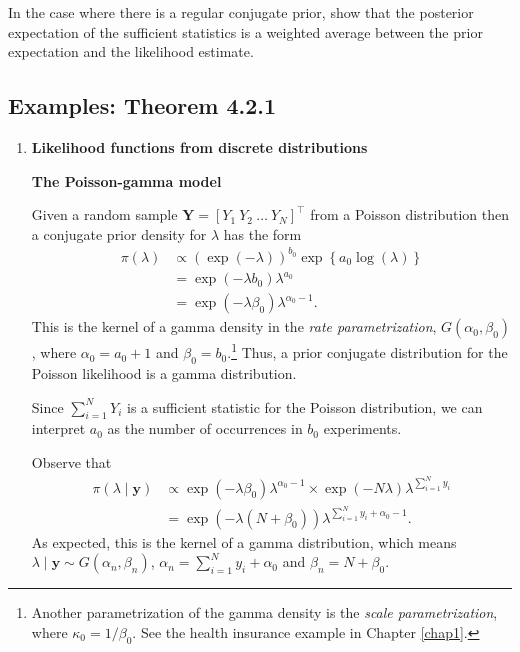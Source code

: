In the case where there is a regular conjugate prior, \cite{diaconis1979conjugate} show that the posterior expectation of the sufficient statistics is a weighted average between the prior expectation and the likelihood estimate.

\subsection{Examples: Theorem 4.2.1}\label{sec421}

\begin{enumerate}
	\item \textbf{Likelihood functions from discrete distributions}

\textbf{The Poisson-gamma model}

Given a random sample $\bm{Y}=[Y_1 \ Y_2 \ \dots \ Y_N]^{\top}$ from a Poisson distribution then a conjugate prior density for $\lambda$ has the form 
\begin{align}
	\pi(\lambda)&\propto \left(\exp(-\lambda)\right)^{b_0} \exp\left\{a_0\log(\lambda)\right\}\nonumber\\
	& = \exp(-\lambda b_0) \lambda^{a_0}\nonumber\\
	& = \exp(-\lambda \beta_0) \lambda^{\alpha_0-1}.\nonumber
\end{align}
This is the kernel of a gamma density in the \textit{rate parametrization}, \( G(\alpha_0, \beta_0) \), where \( \alpha_0 = a_0 + 1 \) and \( \beta_0 = b_0 \).\footnote{Another parametrization of the gamma density is the \textit{scale parametrization}, where \( \kappa_0 = 1/\beta_0 \). See the health insurance example in Chapter \ref{chap1}.} Thus, a prior conjugate distribution for the Poisson likelihood is a gamma distribution.

Since \( \sum_{i=1}^N Y_i \) is a sufficient statistic for the Poisson distribution, we can interpret \( a_0 \) as the number of occurrences in \( b_0 \) experiments.

Observe that
\begin{align}
	\pi(\lambda\mid \bm{y})&\propto \exp(-\lambda \beta_0) \lambda^{\alpha_0-1} \times \exp(-N\lambda)\lambda^{\sum_{i=1}^Ny_i}\nonumber\\
	&= \exp(-\lambda(N+\beta_0)) \lambda^{\sum_{i=1}^Ny_i+\alpha_0-1}.\nonumber 
\end{align}
As expected, this is the kernel of a gamma distribution, which means $\lambda\mid \bm{y}\sim G(\alpha_n,\beta_n)$, $\alpha_n=\sum_{i=1}^Ny_i+\alpha_0$ and $\beta_n=N+\beta_0$.


\end{enumerate}
